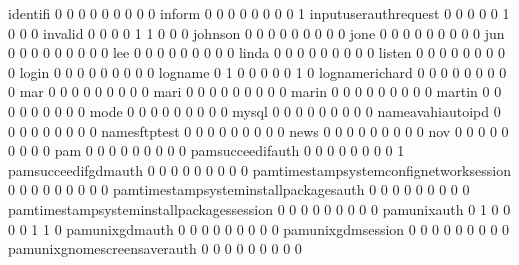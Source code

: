 \documentclass[compress,8pt]{beamer}
\begin{document}
\begin{frame}
\begin{Schunk}
  identifi                                   0   0   0   0   0   0   0   0   0
  inform                                     0   0   0   0   0   0   0   0   1
  inputuserauthrequest                       0   0   0   0   0   1   0   0   0
  invalid                                    0   0   0   0   1   1   0   0   0
  johnson                                    0   0   0   0   0   0   0   0   0
  jone                                       0   0   0   0   0   0   0   0   0
  jun                                        0   0   0   0   0   0   0   0   0
  lee                                        0   0   0   0   0   0   0   0   0
  linda                                      0   0   0   0   0   0   0   0   0
  listen                                     0   0   0   0   0   0   0   0   0
  login                                      0   0   0   0   0   0   0   0   0
  logname                                    0   1   0   0   0   0   0   1   0
  lognamerichard                             0   0   0   0   0   0   0   0   0
  mar                                        0   0   0   0   0   0   0   0   0
  mari                                       0   0   0   0   0   0   0   0   0
  marin                                      0   0   0   0   0   0   0   0   0
  martin                                     0   0   0   0   0   0   0   0   0
  mode                                       0   0   0   0   0   0   0   0   0
  mysql                                      0   0   0   0   0   0   0   0   0
  nameavahiautoipd                           0   0   0   0   0   0   0   0   0
  namesftptest                               0   0   0   0   0   0   0   0   0
  news                                       0   0   0   0   0   0   0   0   0
  nov                                        0   0   0   0   0   0   0   0   0
  pam                                        0   0   0   0   0   0   0   0   0
  pamsucceedifauth                           0   0   0   0   0   0   0   0   1
  pamsucceedifgdmauth                        0   0   0   0   0   0   0   0   0
  pamtimestampsystemconfignetworksession     0   0   0   0   0   0   0   0   0
  pamtimestampsysteminstallpackagesauth      0   0   0   0   0   0   0   0   0
  pamtimestampsysteminstallpackagessession   0   0   0   0   0   0   0   0   0
  pamunixauth                                0   1   0   0   0   0   1   1   0
  pamunixgdmauth                             0   0   0   0   0   0   0   0   0
  pamunixgdmsession                          0   0   0   0   0   0   0   0   0
  pamunixgnomescreensaverauth                0   0   0   0   0   0   0   0   0

\end{Schunk}
\end{frame}
\end{document}

